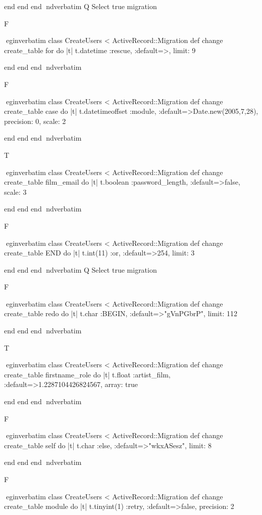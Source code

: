     end 
  end 
end
nd{verbatim}
Q
 Select true migration

F

egin{verbatim}
 class CreateUsers < ActiveRecord::Migration 
  def change 
    create_table for do |t| 
      t.datetime :rescue, :default=>, limit: 9
    
    end 
  end 
end
nd{verbatim}

F

egin{verbatim}
 class CreateUsers < ActiveRecord::Migration 
  def change 
    create_table case do |t| 
      t.datetimeoffset :module, :default=>Date.new(2005,7,28), precision: 0, scale: 2
    
    end 
  end 
end
nd{verbatim}

T

egin{verbatim}
 class CreateUsers < ActiveRecord::Migration 
  def change 
    create_table film_email do |t| 
      t.boolean :password_length, :default=>false, scale: 3
    
    end 
  end 
end
nd{verbatim}

F

egin{verbatim}
 class CreateUsers < ActiveRecord::Migration 
  def change 
    create_table END do |t| 
      t.int(11) :or, :default=>254, limit: 3
    
    end 
  end 
end
nd{verbatim}
Q
 Select true migration

F

egin{verbatim}
 class CreateUsers < ActiveRecord::Migration 
  def change 
    create_table redo do |t| 
      t.char :BEGIN, :default=>"gVnPGbrP", limit: 112
    
    end 
  end 
end
nd{verbatim}

T

egin{verbatim}
 class CreateUsers < ActiveRecord::Migration 
  def change 
    create_table firstname_role do |t| 
      t.float :artist_film, :default=>1.2287104426824567, array: true
    
    end 
  end 
end
nd{verbatim}

F

egin{verbatim}
 class CreateUsers < ActiveRecord::Migration 
  def change 
    create_table self do |t| 
      t.char :else, :default=>"wkxASesz", limit: 8
    
    end 
  end 
end
nd{verbatim}

F

egin{verbatim}
 class CreateUsers < ActiveRecord::Migration 
  def change 
    create_table module do |t| 
      t.tinyint(1) :retry, :default=>false, precision: 2
    

